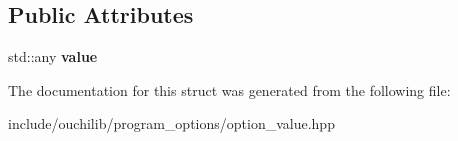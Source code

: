 \subsection*{Public Attributes}
\begin{DoxyCompactItemize}
\item 
\mbox{\label{structouchi_1_1program__options_1_1detail_1_1option__info_a1a5a6115874c02cd38c1f33191e56735}} 
std\+::any {\bfseries value}
\end{DoxyCompactItemize}


The documentation for this struct was generated from the following file\+:\begin{DoxyCompactItemize}
\item 
include/ouchilib/program\+\_\+options/option\+\_\+value.\+hpp\end{DoxyCompactItemize}
